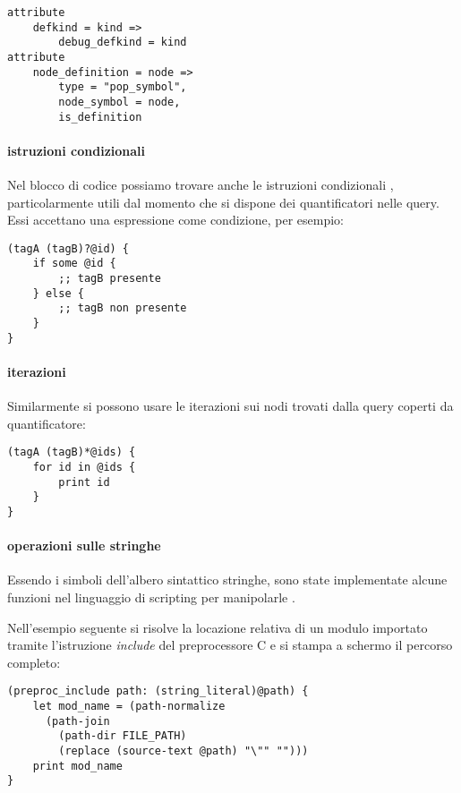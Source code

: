 \begin{Verbatim}[samepage=true]
attribute
    defkind = kind =>
        debug_defkind = kind
attribute
    node_definition = node =>
        type = "pop_symbol",
        node_symbol = node,
        is_definition
\end{Verbatim}

\paragraph{istruzioni condizionali}

Nel blocco di codice possiamo trovare anche le istruzioni condizionali \cite{TreeSitterGraphReferenceConditionals}, particolarmente utili dal momento che si dispone dei quantificatori nelle query.
Essi accettano una espressione come condizione, per esempio:

\begin{Verbatim}[samepage=true]
(tagA (tagB)?@id) {
    if some @id {
        ;; tagB presente
    } else {
        ;; tagB non presente
    }
}
\end{Verbatim}

\paragraph{iterazioni}

Similarmente si possono usare le iterazioni \cite{TreeSitterGraphReferenceListIterations} sui nodi trovati dalla query coperti da quantificatore:

\begin{Verbatim}[samepage=true]
(tagA (tagB)*@ids) {
    for id in @ids {
        print id
    }
}
\end{Verbatim}

\paragraph{operazioni sulle stringhe}

Essendo i simboli dell'albero sintattico stringhe, sono state implementate alcune funzioni nel linguaggio di scripting per manipolarle \cite{TreeSitterGraphReferenceFunctions} \cite{TreeSitterStackGraphPaths}.

Nell'esempio seguente si risolve la locazione relativa di un modulo importato tramite l'istruzione \emph{include} del preprocessore C e si stampa a schermo il percorso completo:

\begin{Verbatim}[samepage=true]
(preproc_include path: (string_literal)@path) {
    let mod_name = (path-normalize
      (path-join
        (path-dir FILE_PATH)
        (replace (source-text @path) "\"" "")))
    print mod_name
}
\end{Verbatim}

